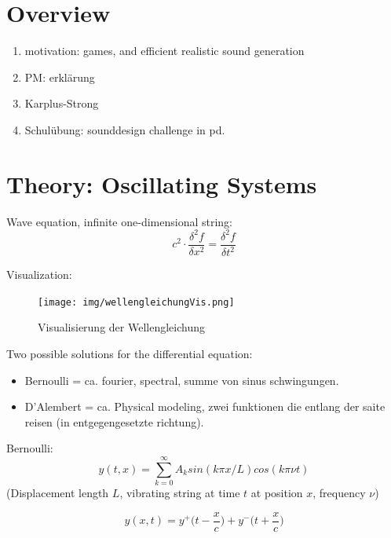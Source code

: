 \section{Overview}


\begin{enumerate}
	\item motivation: games, and efficient realistic sound generation
	\item PM: erklärung
	\item Karplus-Strong
	\item Schulübung: sounddesign challenge in pd.

\end{enumerate}

\section{Theory: Oscillating Systems}


Wave equation, infinite one-dimensional string:
\begin{equation}
	c^2 \cdot \frac{\delta^2 f}{\delta x^2} = \frac{\delta ^2 f}{\delta t ^2}
\end{equation}

Visualization:

\begin{figure}[H]
  \begin{center}
    \texttt{[image: img/wellengleichungVis.png]}
    \caption{Visualisierung der Wellengleichung}
    \label{fig:wellengleichung}
  \end{center}
\end{figure}




Two possible solutions for the differential equation:
\begin{itemize}
	\item Bernoulli = ca. fourier, spectral, summe von sinus schwingungen.
	\item D'Alembert = ca. Physical modeling, zwei funktionen die entlang der saite reisen (in entgegengesetzte richtung).
\end{itemize}

Bernoulli:
\begin{equation}
  y(t,x) = \sum^{\infty}_{k=0} A_k sin(k\pi x/L)cos(k\pi \nu t)
\end{equation}
(Displacement length $L$, vibrating string at time $t$ at position $x$, frequency $\nu$)

\begin{equation}
y(x, t) = y ^+ \Bigg(t - \frac{x}{c}\Bigg) + y^- \Bigg(t + \frac{x}{c} \Bigg)
\end{equation}

